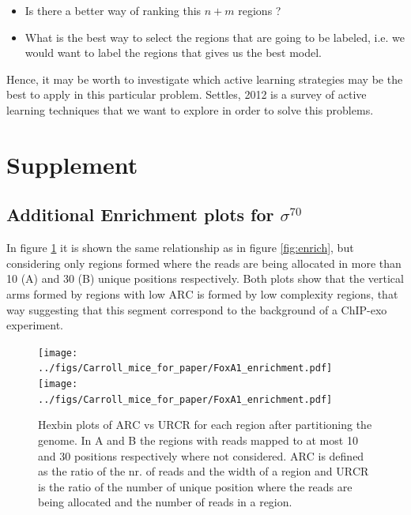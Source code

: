 \documentclass[11pt]{article}\usepackage[]{graphicx}\usepackage[]{color}
\begin{document}
\begin{itemize}
\item Is there a better way of ranking this $n+m$ regions ?
\item What is the best way to select the regions that are going to be
  labeled, i.e. we would want to label the regions that gives us the
  best model.
\end{itemize}

Hence, it may be worth to investigate which active learning strategies
may be the best to apply in this particular problem. Settles, 2012
\cite{al} is a survey of active learning techniques that we want to
explore in order to solve this problems.



\newpage


\nocite{exo_gb}
\nocite{maplot1}
\nocite{maplot2}
\nocite{esl}
\nocite{anp}
\nocite{al}
\nocite{oc_review}
\nocite{exo4}

\section*{Supplement}
\label{sec:supp}


\subsection*{Additional Enrichment plots for $\sigma^{70}$}
\label{sec:enrichsup}

In figure \ref{fig:enrich2} it is shown the same relationship as in
figure \ref{fig:enrich}, but considering only regions formed where the
reads are being allocated in more than 10 (A) and 30 (B) unique
positions respectively. Both plots show that the vertical arms formed
by regions with low $\mbox{ARC}$ is formed by low complexity regions,
that way suggesting that this segment correspond to the background of
a ChIP-exo experiment.

\begin{figure}[h!]
  \centering
  \texttt{[image: ../figs/Carroll\_mice\_for\_paper/FoxA1\_enrichment.pdf]}
  \texttt{[image: ../figs/Carroll\_mice\_for\_paper/FoxA1\_enrichment.pdf]}
  \caption{Hexbin plots of $\mbox{ARC}$ vs $\mbox{URCR}$ for each
    region after partitioning the genome. In A and B the regions with
    reads mapped to at most 10 and 30 positions respectively where not
    considered. $\mbox{ARC}$ is defined as the ratio of the nr. of
    reads and the width of a region and $\mbox{URCR}$ is the ratio of
    the number of unique position where the reads are being allocated
    and the number of reads in a region.}
  \label{fig:enrich2}
\end{figure}
\end{document}
